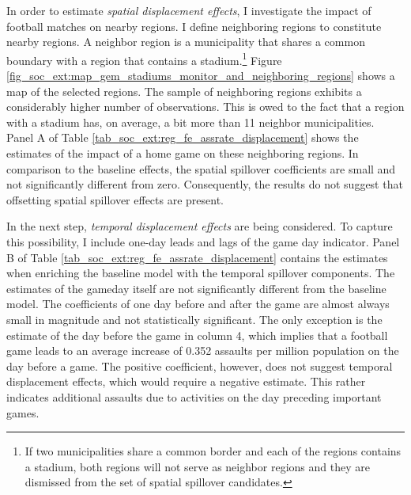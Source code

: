 In order to estimate \textit{spatial displacement effects}, I investigate the impact of football matches on nearby regions. I define neighboring regions to constitute nearby regions. A neighbor region is a municipality that shares a common boundary with a region that contains a stadium.\footnote{If two municipalities share a common border and each of the regions contains a stadium, both regions will not serve as neighbor regions and they are dismissed from the set of spatial spillover candidates.} Figure \ref{fig_soc_ext:map_gem_stadiums_monitor_and_neighboring_regions} shows a map of the selected regions. The sample of neighboring regions exhibits a considerably higher number of observations. This is owed to the fact that a region with a stadium has, on average, a bit more than 11 neighbor municipalities. Panel A of Table \ref{tab_soc_ext:reg_fe_assrate_displacement} shows the estimates of the impact of a home game on these neighboring regions. In comparison to the baseline effects, the spatial spillover coefficients are small and not significantly different from zero. Consequently, the results do not suggest that offsetting spatial spillover effects are present.

In the next step, \textit{temporal displacement effects} are being considered. To capture this possibility, I include one-day leads and lags of the game day indicator. Panel B of Table \ref{tab_soc_ext:reg_fe_assrate_displacement} contains the estimates when enriching the baseline model with the temporal spillover components. The estimates of the gameday itself are not significantly different from the baseline model. The coefficients of one day before and after the game are almost always small in magnitude and not statistically significant. The only exception is the estimate of the day before the game in column 4, which implies that a football game leads to an average increase of 0.352 assaults per million population on the day before a game. The positive coefficient, however, does not suggest temporal displacement effects, which would require a negative estimate. This rather indicates additional assaults due to activities on the day preceding important games. 




